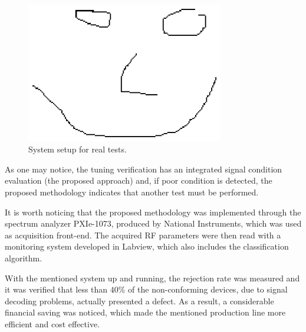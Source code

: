 \documentclass[conference]{IEEEtran}
\begin{document}
\begin{figure}[ht]
\centerline{\includegraphics[width=3.4in]{Fig1.eps}}
\caption{System setup for real tests.}
\label{figure:fig1}
\end{figure}

As one may notice, the tuning verification has an integrated signal condition evaluation  (the proposed approach) and, if poor condition is detected, the proposed methodology indicates that another test must be performed. 

It is worth noticing that the proposed methodology was implemented through the spectrum analyzer PXIe-1073, produced by National Instruments, which was used as acquisition front-end. The acquired RF parameters were then read with a monitoring system developed in Labview, which also includes the classification algorithm.

With the mentioned system up and running, the rejection rate was measured and it was verified that less than $40\%$ of the non-conforming devices, due to signal decoding problems, actually presented a defect. As a result, a considerable financial saving was noticed, which made the mentioned production line more efficient and cost effective.


%
%
\end{document}
